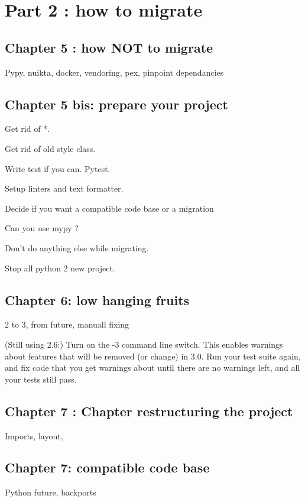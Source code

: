 \documentclass[paperwidth=8in, paperheight=10in,lang=en]{elegantbook}
\begin{document}
\part{Part 2 : how to migrate}

\chapter{Chapter 5 : how NOT to migrate}

Pypy, nuikta, docker, vendoring, pex, pinpoint dependancies

\chapter{Chapter 5 bis: prepare your project}

Get rid of *.

Get rid of old style class.

Write test if you can. Pytest.

Setup linters and text formatter.

Decide if you want a compatible code base or a migration

Can you use mypy ?

Don't do anything else while migrating.

Stop all python 2 new project.

\chapter{Chapter 6: low hanging fruits}

2 to 3, from future, manuall fixing

(Still using 2.6:) Turn on the -3 command line switch. This enables warnings about features that will be removed (or change) in 3.0. Run your test suite again, and fix code that you get warnings about until there are no warnings left, and all your tests still pass.

\chapter{Chapter 7 : Chapter restructuring the project}

Imports, layout,

\chapter{Chapter 7: compatible code base}

Python future, backports
\end{document}
